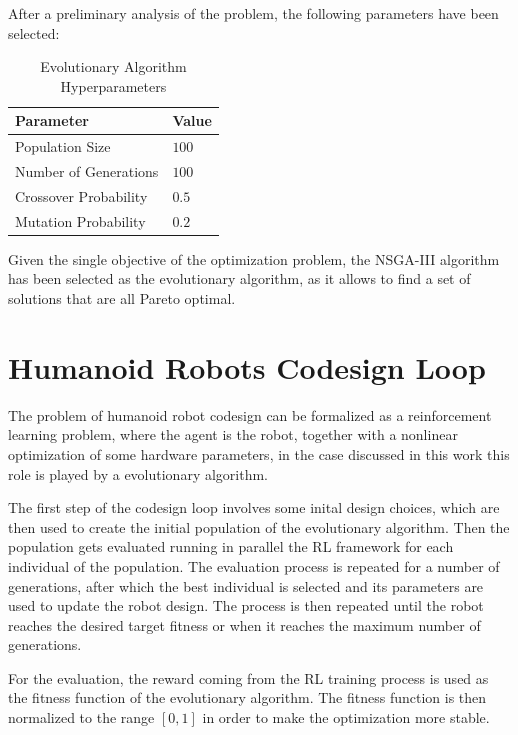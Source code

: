 After a preliminary analysis of the problem, the following parameters have been selected:

\begin{table}
    \centering
    \begin{tabular}{ll}
        \toprule
        \textbf{Parameter}    & \textbf{Value} \\
        \midrule
        Population Size       & $100$          \\
        Number of Generations & $100$          \\
        Crossover Probability & $0.5$          \\
        Mutation Probability  & $0.2$          \\
        \bottomrule
    \end{tabular}
    \caption{Evolutionary Algorithm Hyperparameters}
\end{table}

Given the single objective of the optimization problem, the \ac{NSGA}-III algorithm has been selected as the evolutionary algorithm, as it allows to find a set of solutions that are all Pareto optimal.


\section{Humanoid Robots Codesign Loop}
\label{sec:Codesign}

The problem of humanoid robot codesign can be formalized as a reinforcement learning problem, where the agent is the robot, together with a nonlinear optimization of some hardware parameters, in the case discussed in this work this role is played by a evolutionary algorithm.

The first step of the codesign loop involves some inital design choices, which are then used to create the initial population of the evolutionary algorithm. Then the population gets evaluated running in parallel the \ac{RL} framework for each individual of the population. The evaluation process is repeated for a number of generations, after which the best individual is selected and its parameters are used to update the robot design. The process is then repeated until the robot reaches the desired target fitness or when it reaches the maximum number of generations.

For the evaluation, the reward coming from the \ac{RL} training process is used as the fitness function of the evolutionary algorithm. The fitness function is then normalized to the range $[0,1]$ in order to make the optimization more stable.
